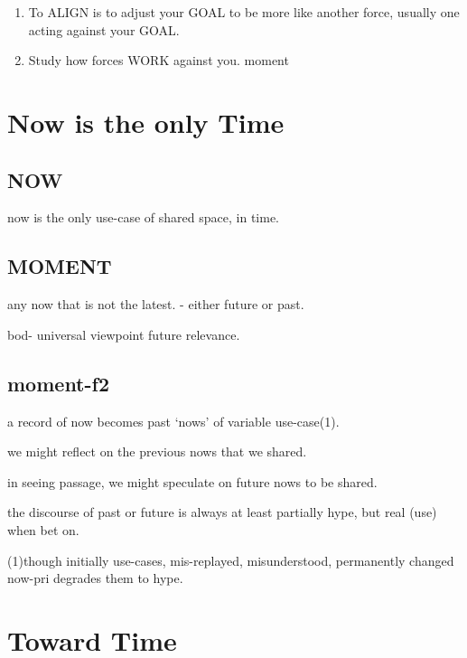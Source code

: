 \documentclass[
]{book}
\providecommand{\tightlist}{%
  \setlength{\itemsep}{0pt}\setlength{\parskip}{0pt}}
\begin{document}
\begin{enumerate}
  \begin{enumerate}
  \def\labelenumii{\arabic{enumii}.}
  \tightlist
  \item
    To ALIGN is to adjust your GOAL to be more like another force, usually one acting against your GOAL.
  \item
    Study how forces WORK against you.
    moment
  \end{enumerate}
\end{enumerate}

\hypertarget{now-is-the-only-time}{%
\section{Now is the only Time}\label{now-is-the-only-time}}

\hypertarget{now}{%
\subsection{NOW}\label{now}}

now is the only use-case
of shared space, in time.

\hypertarget{moment}{%
\subsection{MOMENT}\label{moment}}

any now that is not the latest.
- either future or past.

bod-
universal viewpoint
future relevance.

\hypertarget{moment-f2}{%
\subsection{moment-f2}\label{moment-f2}}

a record of now becomes past `nows'
of variable use-case(1).

we might reflect on the previous
nows that we shared.

in seeing passage,
we might speculate on future
nows to be shared.

the discourse of past or future
is always at least partially hype,
but real (use) when bet on.

(1)though initially use-cases,
mis-replayed, misunderstood,
permanently changed now-pri
degrades them to hype.

\hypertarget{toward-time}{%
\section{Toward Time}\label{toward-time}}
\end{document}
